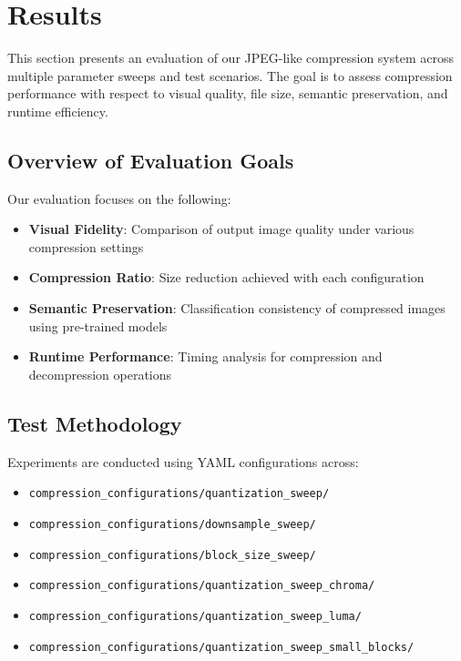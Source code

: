 \section{Results}
\label{sec:results}

This section presents an evaluation of our JPEG-like compression system across multiple parameter sweeps and test scenarios. The goal is to assess compression performance with respect to visual quality, file size, semantic preservation, and runtime efficiency.

\subsection{Overview of Evaluation Goals}
Our evaluation focuses on the following:
\begin{itemize}
    \item \textbf{Visual Fidelity}: Comparison of output image quality under various compression settings
    \item \textbf{Compression Ratio}: Size reduction achieved with each configuration
    \item \textbf{Semantic Preservation}: Classification consistency of compressed images using pre-trained models
    \item \textbf{Runtime Performance}: Timing analysis for compression and decompression operations
\end{itemize}

\subsection{Test Methodology}
Experiments are conducted using YAML configurations across:
\begin{itemize}
    \item \texttt{compression\_configurations/\allowbreak quantization\_sweep/}
    \item \texttt{compression\_configurations/\allowbreak downsample\_sweep/}
    \item \texttt{compression\_configurations/\allowbreak block\_size\_sweep/}
    \item \texttt{compression\_configurations/\allowbreak quantization\_sweep\_chroma/}
    \item \texttt{compression\_configurations/\allowbreak quantization\_sweep\_luma/}
    \item \texttt{compression\_configurations/\allowbreak quantization\_sweep\_small\_blocks/}
\end{itemize}

